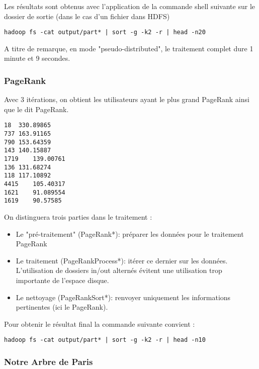 \documentclass[french]{article}
\begin{document}
Les résultats sont obtenus avec l'application de la commande shell suivante sur le dossier de sortie (dans le cas d'un fichier dans HDFS)

\begin{verbatim}
hadoop fs -cat output/part* | sort -g -k2 -r | head -n20
\end{verbatim}

A titre de remarque, en mode "pseudo-distributed", le traitement complet dure 1 minute et 9 secondes.

\subsubsection{PageRank}

Avec 3 itérations, on obtient les utilisateurs ayant le plus grand PageRank ainsi que le dit PageRank.

\begin{verbatim}
18	330.89865
737	163.91165
790	153.64359
143	140.15887
1719	139.00761
136	131.68274
118	117.10892
4415	105.40317
1621	91.089554
1619	90.57585
\end{verbatim}

On distinguera trois parties dans le traitement :

\begin{itemize}
	\item Le "pré-traitement" (PageRank*): préparer les données pour le traitement PageRank
	\item Le traitement (PageRankProcess*): itérer ce dernier sur les données. L'utilisation de dossiers in/out alternés évitent une utilisation trop importante de l'espace disque.
	\item Le nettoyage (PageRankSort*): renvoyer uniquement les informations pertinentes (ici le PageRank).
\end{itemize}

Pour obtenir le résultat final la commande suivante convient : 

\begin{verbatim}
hadoop fs -cat output/part* | sort -g -k2 -r | head -n10
\end{verbatim}

\subsubsection{Notre Arbre de Paris}
\end{document}
